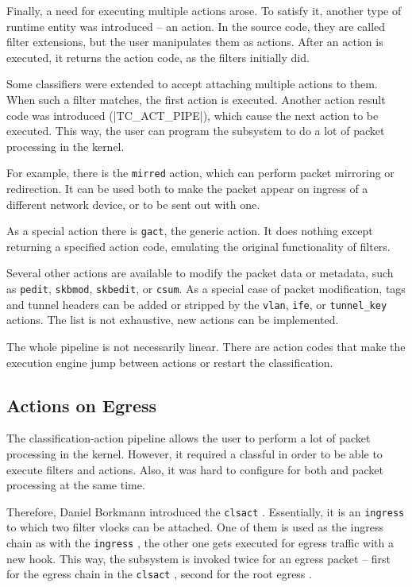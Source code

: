 Finally, a need for executing multiple actions arose. To satisfy it,
another type of runtime entity was introduced -- an action. In the source code,
they are called filter extensions, but the user manipulates them as
actions. After an action is executed, it returns the action code, as the
filters initially did.

Some classifiers were extended to accept attaching multiple actions to them. When such a
filter matches, the first action is executed. Another action result code was
introduced (\macro|TC_ACT_PIPE|), which cause the next action to be executed. This
way, the user can program the subsystem to do a lot of packet processing in the
kernel.

For example, there is the \texttt{mirred} action, which can perform packet
mirroring or redirection. It can be used both to make the packet appear on
ingress of a different network device, or to be sent out with one.

As a special action there is \texttt{gact}, the generic action. It does
nothing except returning a specified action code, emulating the original
functionality of filters.

Several other actions are available to modify the packet data or metadata,
such as \texttt{pedit}, \texttt{skbmod}, \texttt{skbedit}, or \texttt{csum}. As
a special case of packet modification,  tags and tunnel headers can
be added or stripped by the \texttt{vlan}, \texttt{ife}, or \texttt{tunnel\_key}
actions. The list is not exhaustive, new actions can be implemented.

The whole pipeline is not necessarily linear. There are action codes that
make the execution engine jump between actions or restart the classification.

\subsection{Actions on Egress}

The classification-action pipeline allows the user to perform a lot of packet
processing in the kernel. However, it required a classful \qdisc{} in order to
be able to execute filters and actions. Also, it was hard to configure 
for both  and packet processing at the same time.

Therefore, Daniel Borkmann introduced the \texttt{clsact} \qdisc
\cite{linux-tc-clsact}. Essentially, it is an \texttt{ingress} \qdisc{} to which
two filter vlocks can be attached. One of them is used as the ingress chain as
with the \texttt{ingress} \qdisc, the other one gets executed for egress traffic
with a new hook. This way, the  subsystem is invoked twice for an egress
packet -- first for the egress chain in the \texttt{clsact} \qdisc, second for the
root egress \qdisc.

